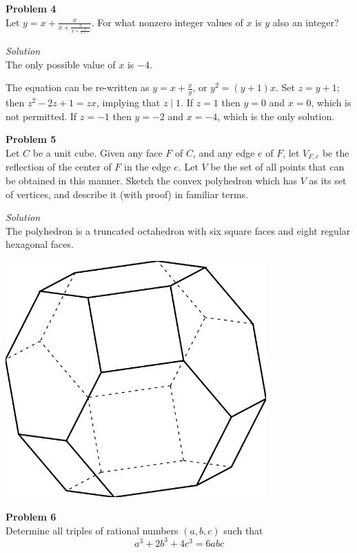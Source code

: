 \documentclass{amsart}
\begin{document}
\pagebreak

\textbf{Problem 4}\\
Let $\displaystyle y = x + \frac{x}{x + \frac{x}{x + \frac{x}{x + \cdots}}}$.
For what nonzero integer values of $x$ is $y$ also an integer?

\textit{Solution}\\
The only possible value of $x$ is $-4$.

The equation can be re-written as $y = x + \frac{x}{y}$, or $y^2 = (y + 1)x$.
Set $z = y + 1$; then $z^2 - 2z + 1 = zx$, implying that $z \mid 1$.
If $z = 1$ then $y = 0$ and $x = 0$, which is not permitted.
If $z = -1$ then $y = -2$ and $x = -4$, which is the only solution.

\pagebreak

\textbf{Problem 5}\\
Let $C$ be a unit cube.
Given any face $F$ of $C$, and any edge $e$ of $F$, let $V_{F, e}$ be the reflection of the center of $F$ in the edge $e$.
Let $V$ be the set of all points that can be obtained in this manner.
Sketch the convex polyhedron which has $V$ as its set of vertices, and describe it (with proof) in familiar terms.

\textit{Solution}\\
The polyhedron is a truncated octahedron with six square faces and eight regular hexagonal faces.

\includegraphics[width=10cm]{Images/Truncated-Octahedron}

\pagebreak

\textbf{Problem 6}\\
Determine all triples of rational numbers $(a, b, c)$ such that
\[ a^3 + 2b^3 + 4c^3 = 6abc \]
\end{document}
